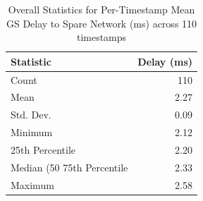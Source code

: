 \begin{table}[htbp]
\centering
\caption{Overall Statistics for Per-Timestamp Mean GS Delay to Spare Network (ms) across 110 timestamps}
\label{tab:gs_delay_overall_mean}
\begin{tabular}{lr}
\toprule
Statistic & Delay (ms) \\
\midrule
Count & 110 \\
Mean & 2.27 \\
Std. Dev. & 0.09 \\
Minimum & 2.12 \\
25th Percentile & 2.20 \\
Median (50%
75th Percentile & 2.33 \\
Maximum & 2.58 \\
\bottomrule
\end{tabular}
\end{table}
